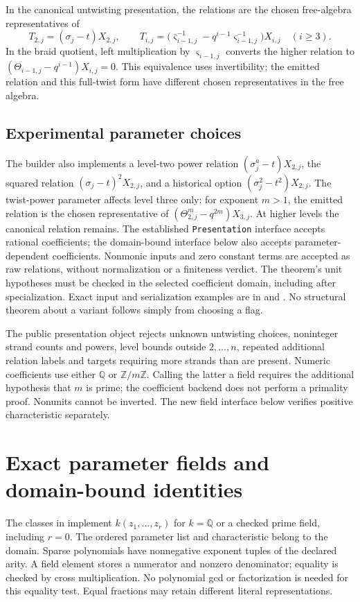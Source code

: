\documentclass[11pt]{article}
\newcommand{\Q}{\mathbb Q}
\newcommand{\Z}{\mathbb Z}
\begin{document}
In the canonical untwisting presentation, the relations are the chosen
free-algebra representatives of
\[
 T_{2,j}=(\sigma_j-t)X_{2,j},\qquad
 T_{i,j}=\bigl(\bar{\varsigma}_{i-1,j}^{-1}
            -q^{i-1}\varsigma_{i-1,j}^{-1}\bigr)X_{i,j}\quad(i\ge3).
\]
In the braid quotient, left multiplication by $\varsigma_{i-1,j}$ converts
the higher relation to $(\Theta_{i-1,j}-q^{i-1})X_{i,j}=0$.
This equivalence uses invertibility; the emitted relation and this full-twist
form have different chosen representatives in the free algebra.

\subsection{Experimental parameter choices}
The builder also implements a level-two power relation $(\sigma_j^a-t)X_{2,j}$,
the squared relation $(\sigma_j-t)^2X_{2,j}$, and a historical option
$(\sigma_j^2-t^2)X_{2,j}$. The twist-power parameter affects level three only:
for exponent $m>1$, the emitted relation is the chosen representative of
$(\Theta_{2,j}^m-q^{2m})X_{3,j}$. At higher levels the canonical relation remains.
The established \texttt{Presentation} interface accepts rational coefficients;
the domain-bound interface below also accepts parameter-dependent coefficients.
Nonmonic inputs and zero constant terms are accepted as raw relations, without
normalization or a finiteness verdict. The theorem's unit hypotheses must be
checked in the selected coefficient domain, including after specialization.
Exact input and serialization examples are in
 and .
No structural theorem about a variant follows simply from choosing a flag.

The public presentation object rejects unknown untwisting choices, noninteger
strand counts and powers, level bounds outside $2,\ldots,n$, repeated additional
relation labels and targets requiring more strands than are present. Numeric
coefficients use either $\Q$ or $\Z/m\Z$. Calling the latter a field requires
the additional hypothesis that $m$ is prime; the coefficient backend does not
perform a primality proof. Nonunits cannot be inverted. The new field interface
below verifies positive characteristic separately.

\section{Exact parameter fields and domain-bound identities}
The classes in  implement
$k(z_1,\ldots,z_r)$ for $k=\Q$ or a checked prime field, including $r=0$.
The ordered parameter list and characteristic belong to the domain. Sparse
polynomials have nonnegative exponent tuples of the declared arity. A field
element stores a numerator and nonzero denominator; equality is checked by
cross multiplication. No polynomial gcd or factorization is needed for this
equality test. Equal fractions may retain different literal representations.
\end{document}

